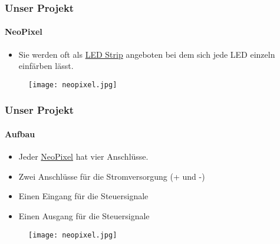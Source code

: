 \begin{frame}
    \frametitle{Unser Projekt}
    \framesubtitle{NeoPixel}
    \begin{minipage}{0.5\textwidth}
        \begin{itemize}
            \item Sie werden oft als \href{https://en.wikipedia.org/wiki/LED_strip_light}{LED Strip} angeboten bei dem sich jede LED einzeln einfärben lässt.
        \end{itemize}
    \end{minipage} \hfill
    \begin{minipage}{0.45\textwidth}
        \begin{figure}
            \texttt{[image: neopixel.jpg]}
        \end{figure}
    \end{minipage}
\end{frame}

\begin{frame}
    \frametitle{Unser Projekt}
    \framesubtitle{Aufbau}
    \begin{minipage}{0.5\textwidth}
        \begin{itemize}
            \item Jeder \href{https://en.wikipedia.org/wiki/Adafruit_Industries\#NeoPixel}{NeoPixel} hat vier Anschlüsse.
            \item Zwei Anschlüsse für die Stromversorgung (+ und -)
            \item Einen Eingang für die Steuersignale
            \item Einen Ausgang für die Steuersignale
        \end{itemize}
    \end{minipage} \hfill
    \begin{minipage}{0.45\textwidth}
        \begin{figure}
            \texttt{[image: neopixel.jpg]}
        \end{figure}
    \end{minipage}
\end{frame}

